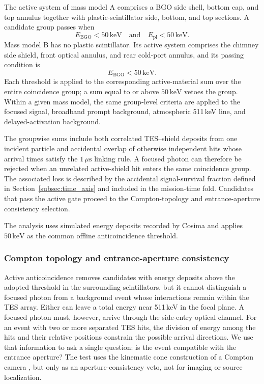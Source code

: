 \documentclass[11pt]{article}
\newcommand{\keV}{\ensuremath{\,\mathrm{keV}}}
\begin{document}
The active system of mass model A comprises a BGO side shell, bottom cap, and
top annulus together with plastic-scintillator side, bottom, and top sections.
A candidate group passes when
\[
 E_{\mathrm{BGO}}<50\keV
 \quad\text{and}\quad
 E_{\mathrm{pl}}<50\keV .
\]
Mass model B has no plastic scintillator. Its active system comprises the
chimney side shield, front optical annulus, and rear cold-port annulus, and its
passing condition is
\[
 E_{\mathrm{BGO}}<50\keV .
\]
Each threshold is applied to the corresponding active-material sum over the
entire coincidence group; a sum equal to or above $50\keV$ vetoes the group.
Within a given mass model, the same group-level criteria are applied to the
focused signal, broadband prompt background, atmospheric 511\,keV line, and
delayed-activation background.

The groupwise sums include both correlated TES--shield deposits from one
incident particle and accidental overlap of otherwise independent hits whose
arrival times satisfy the $1\,\mu\mathrm{s}$ linking rule. A focused photon can
therefore be rejected when an unrelated active-shield hit enters the same
coincidence group. The associated loss is described by the accidental
signal-survival fraction defined in Section~\ref{subsec:time_axis} and included
in the mission-time fold. Candidates that pass the active gate proceed to the
Compton-topology and entrance-aperture consistency selection.

The analysis uses simulated energy deposits recorded by Cosima and applies
$50\keV$ as the common offline anticoincidence threshold.

\subsubsection{Compton topology and entrance-aperture consistency}

Active anticoincidence removes candidates with energy deposits above the adopted
threshold in the surrounding scintillators, but it cannot distinguish a focused photon from a
background event whose interactions remain within the TES array. Either can
leave a total energy near 511\,keV in the focal plane. A focused photon must,
however, arrive through the side-entry optical channel. For an event with two
or more separated TES hits, the division of energy among the hits and their
relative positions constrain the possible arrival directions. We use that
information to ask a single question: is the event compatible with the entrance
aperture? The test uses the kinematic cone construction of a Compton camera
\cite{Zoglauer2006}, but only as an aperture-consistency veto, not for imaging
or source localization.
\end{document}
